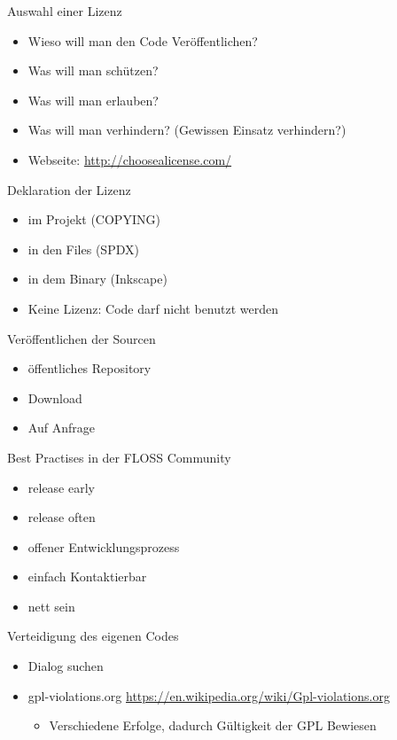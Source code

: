 \begin{frame}{Auswahl einer Lizenz}
	\begin{itemize}
		\item Wieso will man den Code Veröffentlichen? 
		\item Was will man schützen?
		\item Was will man erlauben?
		\item Was will man verhindern? (Gewissen Einsatz verhindern?)
		\item Webseite: \url{http://choosealicense.com/}
	\end{itemize}
\end{frame}

\begin{frame}{Deklaration der Lizenz}
	\begin{itemize}
		\item im Projekt (COPYING)
		\item in den Files (SPDX)
		\item in dem Binary (Inkscape)
		\item Keine Lizenz: Code darf nicht benutzt werden
	\end{itemize}
\end{frame}

\begin{frame}{Veröffentlichen der Sourcen}
	\begin{itemize}
		\item öffentliches Repository
		\item Download
		\item Auf Anfrage
	\end{itemize}
\end{frame}

\begin{frame}{Best Practises in der FLOSS Community}
	\begin{itemize}
		\item release early
		\item release often
		\item offener Entwicklungsprozess
		\item einfach Kontaktierbar
		\item nett sein
	\end{itemize}
\end{frame}

\begin{frame}{Verteidigung des eigenen Codes}
	\begin{itemize}
		\item Dialog suchen
		\item gpl-violations.org \url{https://en.wikipedia.org/wiki/Gpl-violations.org}
		\begin{itemize}
			\item Verschiedene Erfolge, dadurch Gültigkeit der GPL Bewiesen
		\end{itemize}
	\end{itemize}
\end{frame}
